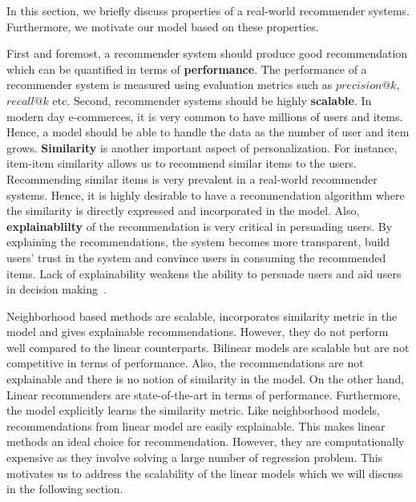 In this section, we briefly discuss properties of a real-world recommender systems. Furthermore, we motivate our model based on these properties.

First and foremost, a recommender system should  produce good recommendation which can be quantified in terms of \textbf{performance}. The performance of a recommender system is measured using evaluation metrics such as $precision@k$, $recall@k$ etc. Second, recommender systems should be highly \textbf{scalable}. In modern day e-commerces, it is very common to have millions of users and items. Hence, a model should be able to handle the data as the number of user and item grows. \textbf{Similarity} is another important aspect of personalization. For instance, item-item similarity allows us to recommend similar items to the users. Recommending similar items is very prevalent in a real-world recommender systems. Hence, it is highly desirable to have a recommendation algorithm where the similarity is directly expressed and incorporated in the model. Also, \textbf{explainablilty} of the recommendation is very critical in persuading users. By explaining the recommendations, the system becomes more transparent, build users' trust in the system and convince users in consuming the recommended items. Lack of explainability weakens the ability to persuade users and aid users in decision making~\citep{explainabiltyVIG2009}.

Neighborhood based methods are scalable, incorporates similarity metric in the model and gives explainable recommendations. However, they do not perform well compared to the linear counterparts. Bilinear models are scalable but are not competitive in terms of performance. Also, the recommendations are not explainable and there is no notion of similarity in the model. On the other hand, Linear recommenders are state-of-the-art in terms of performance. Furthermore, the model explicitly learns the similarity metric. Like neighborhood models, recommendations from linear model are easily explainable. This makes linear methods an ideal choice for recommendation. However, they are computationally expensive as they involve solving a large number of regression problem. This motivates us to address the scalability of the linear models which we will discuss in the following section.


